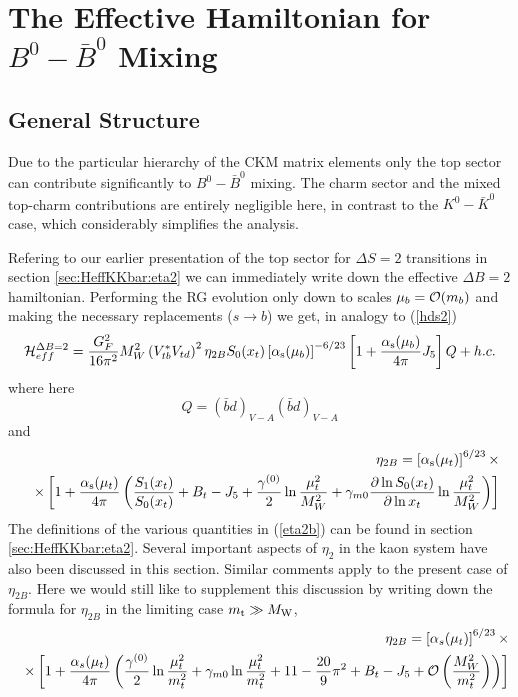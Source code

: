 \section{The Effective Hamiltonian for $B^0-\bar B^0$ Mixing}
\label{sec:HeffBBbar}

\subsection{General Structure}
\label{sec:HeffBBbar:General}
Due to the particular hierarchy of the CKM matrix elements only the
top sector can contribute significantly to $B^0-\bar B^0$ mixing.
The charm sector and the mixed top-charm contributions are
entirely negligible here, in contrast to the $K^0-\bar K^0$ case,
which considerably simplifies the analysis.

Refering to  our earlier presentation of the top sector for $\Delta
S=2$ transitions in section \ref{sec:HeffKKbar:eta2} we can immediately
write down the effective $\Delta B=2$ hamiltonian. Performing the RG
evolution only down to scales $\mu_b={\cal O}(m_b)$ and making the
necessary replacements ($s\to b$) we get, in analogy to (\ref{hds2})
\cite{burasjaminweisz:90}
\begin{equation}\label{hdb2}
{\cal H}^{\Delta B=2}_{eff}=\frac{G^2_F}{16\pi^2}M^2_W
 \left(V^\ast_{tb}V_{td}\right)^2 \eta_{2B}
 S_0(x_t) \left[\alpha_{\rm s}(\mu_b)\right]^{-6/23}\left[
  1 + \frac{\alpha_{\rm s}(\mu_b)}{4\pi} J_5\right]  Q + h. c.
\end{equation}
where here
\begin{equation}\label{qbdbd}
Q=(\bar bd)_{V-A}(\bar bd)_{V-A}
\end{equation}
and
\begin{eqnarray}\label{eta2b}
&&\eta_{2B}=\left[\alpha_{\rm s}(\mu_t)\right]^{6/23}\times
\\
&& \times \left[1+\frac{\alpha_{\rm s}(\mu_t)}{4\pi} \left(
 \frac{S_1(x_t)}{S_0(x_t)}+B_t - J_5+\frac{\gamma^{(0)}}{2}
 \ln\frac{\mu^2_t}{M^2_W}+\gamma_{m0}
 \frac{\partial\ln S_0(x_t)}{\partial\ln x_t}\ln\frac{\mu^2_t}{M^2_W}
\right)\right] \nonumber
\end{eqnarray}
The definitions of the various quantities in (\ref{eta2b}) can
be found in section \ref{sec:HeffKKbar:eta2}.
Several important aspects of $\eta_2$ in the kaon system have also
been discussed in this section. Similar comments apply to the
present case of $\eta_{2B}$.
Here we would still like to supplement this discussion by writing 
down the formula for $\eta_{2B}$ in the limiting case $m_{\rm t}\gg M_{\rm W}$,
\begin{eqnarray}\label{eta2bas}
&&\eta_{2B}=\left[\alpha_s(\mu_t)\right]^{6/23}\times
\\
&& \times \left[1+\frac{\alpha_s(\mu_t)}{4\pi} \left(
\frac{\gamma^{(0)}}{2}\ln\frac{\mu^2_t}{m^2_t}+
\gamma_{m0}\ln\frac{\mu^2_t}{m^2_t}+11-\frac{20}{9}\pi^2+B_t-J_5+
{\cal O}\left(\frac{M^2_W}{m^2_t}\right) \right)\right] \nonumber
\end{eqnarray}
